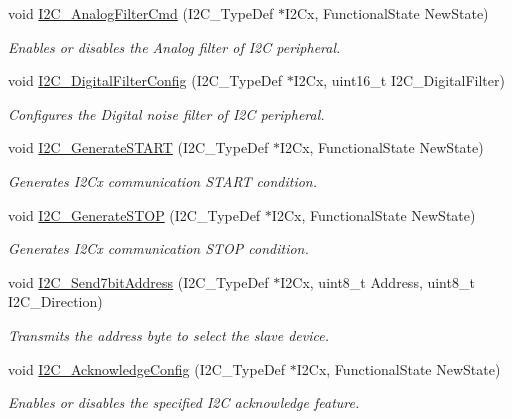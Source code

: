 \begin{DoxyCompactItemize}
void \mbox{\hyperlink{group___i2_c___group1_ga7f92bbdb33774b819232d039c73bf1c2}{I2\+C\+\_\+\+Analog\+Filter\+Cmd}} (I2\+C\+\_\+\+Type\+Def $\ast$I2\+Cx, Functional\+State New\+State)
\begin{DoxyCompactList}\small\item\em Enables or disables the Analog filter of I2C peripheral. \end{DoxyCompactList}\item 
void \mbox{\hyperlink{group___i2_c___group1_ga90b0815858cc14266d2957495fd7e105}{I2\+C\+\_\+\+Digital\+Filter\+Config}} (I2\+C\+\_\+\+Type\+Def $\ast$I2\+Cx, uint16\+\_\+t I2\+C\+\_\+\+Digital\+Filter)
\begin{DoxyCompactList}\small\item\em Configures the Digital noise filter of I2C peripheral. \end{DoxyCompactList}\item 
void \mbox{\hyperlink{group___i2_c___group1_ga36c522b471588be9779c878222ccb20f}{I2\+C\+\_\+\+Generate\+S\+T\+A\+RT}} (I2\+C\+\_\+\+Type\+Def $\ast$I2\+Cx, Functional\+State New\+State)
\begin{DoxyCompactList}\small\item\em Generates I2\+Cx communication S\+T\+A\+RT condition. \end{DoxyCompactList}\item 
void \mbox{\hyperlink{group___i2_c___group1_ga5c92cb573ca0ae58cc465e5400246561}{I2\+C\+\_\+\+Generate\+S\+T\+OP}} (I2\+C\+\_\+\+Type\+Def $\ast$I2\+Cx, Functional\+State New\+State)
\begin{DoxyCompactList}\small\item\em Generates I2\+Cx communication S\+T\+OP condition. \end{DoxyCompactList}\item 
void \mbox{\hyperlink{group___i2_c___group1_ga009fc2a5b2313c36da39ece39a1156a6}{I2\+C\+\_\+\+Send7bit\+Address}} (I2\+C\+\_\+\+Type\+Def $\ast$I2\+Cx, uint8\+\_\+t Address, uint8\+\_\+t I2\+C\+\_\+\+Direction)
\begin{DoxyCompactList}\small\item\em Transmits the address byte to select the slave device. \end{DoxyCompactList}\item 
void \mbox{\hyperlink{group___i2_c___group1_ga7bb44e894d68a7991f564c43fb187486}{I2\+C\+\_\+\+Acknowledge\+Config}} (I2\+C\+\_\+\+Type\+Def $\ast$I2\+Cx, Functional\+State New\+State)
\begin{DoxyCompactList}\small\item\em Enables or disables the specified I2C acknowledge feature. \end{DoxyCompactList}\item 

\end{DoxyCompactItemize}
